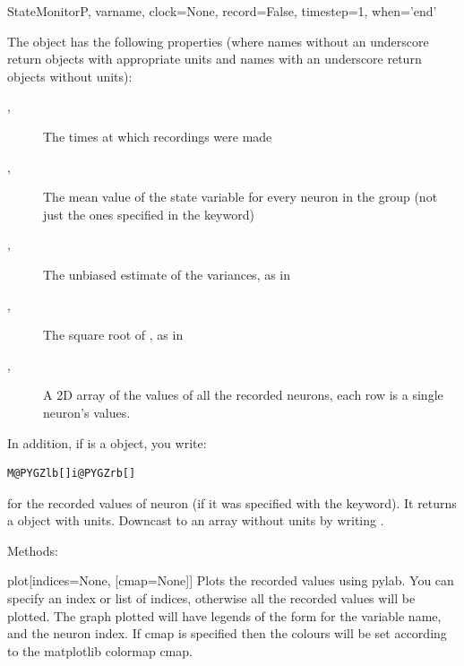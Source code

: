 \documentclass[letterpaper,10pt,english]{manual}
\begin{document}
\begin{classdesc}{StateMonitor}{P, varname, clock=None, record=False, timestep=1, when='end'}
\begin{description}
\end{description}

The \hyperlink{brian.StateMonitor}{} object has the following properties (where names
without an underscore return  objects with appropriate
units and names with an underscore return  objects without
units):
\begin{description}
\item[, ]
The times at which recordings were made

\item[, ]
The mean value of the state variable for every neuron in the
group (not just the ones specified in the  keyword)

\item[, ]
The unbiased estimate of the variances, as in 

\item[, ]
The square root of , as in 

\item[, ]
A 2D array of the values of all the recorded neurons, each row is a
single neuron's values.

\end{description}

In addition, if  is a \hyperlink{brian.StateMonitor}{} object, you write:

\begin{Verbatim}[commandchars=@\[\]]
M@PYGZlb[]i@PYGZrb[]
\end{Verbatim}

for the recorded values of neuron  (if it was specified with the
 keyword). It returns a  object with units. Downcast
to an array without units by writing .

Methods:

\hypertarget{brian.StateMonitor.plot}{}\begin{methoddesc}{plot}{{[}indices=None, {[}cmap=None{]}{]}}
Plots the recorded values using pylab. You can specify an index or
list of indices, otherwise all the recorded values will be plotted.
The graph plotted will have legends of the form  for
 the variable name, and  the neuron index. If cmap is
specified then the colours will be set according to the matplotlib
colormap cmap.
\end{methoddesc}
\end{classdesc}
\end{document}
